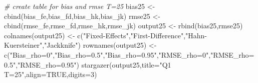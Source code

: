 \documentclass[
]{article}
\newenvironment{Shaded}{\begin{snugshade}}{\end{snugshade}}
\newcommand{\AttributeTok}[1]{\textcolor[rgb]{0.77,0.63,0.00}{#1}}
\newcommand{\CommentTok}[1]{\textcolor[rgb]{0.56,0.35,0.01}{\textit{#1}}}
\newcommand{\ConstantTok}[1]{\textcolor[rgb]{0.00,0.00,0.00}{#1}}
\newcommand{\DecValTok}[1]{\textcolor[rgb]{0.00,0.00,0.81}{#1}}
\newcommand{\FunctionTok}[1]{\textcolor[rgb]{0.00,0.00,0.00}{#1}}
\newcommand{\NormalTok}[1]{#1}
\newcommand{\OtherTok}[1]{\textcolor[rgb]{0.56,0.35,0.01}{#1}}
\newcommand{\StringTok}[1]{\textcolor[rgb]{0.31,0.60,0.02}{#1}}
\begin{document}
\begin{Shaded}
\begin{Highlighting}[]
\CommentTok{\# create table for bias and rmse T=25}
\NormalTok{bias25 }\OtherTok{\textless{}{-}} \FunctionTok{cbind}\NormalTok{(bias\_fe,bias\_fd,bias\_hk,bias\_jk)}
\NormalTok{rmse25 }\OtherTok{\textless{}{-}} \FunctionTok{cbind}\NormalTok{(rmse\_fe,rmse\_fd,rmse\_hk,rmse\_jk)}
\NormalTok{output25 }\OtherTok{\textless{}{-}} \FunctionTok{rbind}\NormalTok{(bias25,rmse25)}
\FunctionTok{colnames}\NormalTok{(output25) }\OtherTok{\textless{}{-}} \FunctionTok{c}\NormalTok{(}\StringTok{"Fixed{-}Effects"}\NormalTok{,}\StringTok{"First{-}Difference"}\NormalTok{,}\StringTok{"Hahn{-}Kuersteiner"}\NormalTok{,}\StringTok{"Jackknife"}\NormalTok{)}
\FunctionTok{rownames}\NormalTok{(output25) }\OtherTok{\textless{}{-}} \FunctionTok{c}\NormalTok{(}\StringTok{"Bias\_rho=0"}\NormalTok{,}\StringTok{"Bias\_rho=0.5"}\NormalTok{,}\StringTok{"Bias\_rho=0.95"}\NormalTok{,}\StringTok{"RMSE\_rho=0"}\NormalTok{,}\StringTok{"RMSE\_rho=0.5"}\NormalTok{,}\StringTok{"RMSE\_rho=0.95"}\NormalTok{)}
\FunctionTok{stargazer}\NormalTok{(output25,}\AttributeTok{title=}\StringTok{"Q1 T=25"}\NormalTok{,}\AttributeTok{align=}\ConstantTok{TRUE}\NormalTok{,}\AttributeTok{digits=}\DecValTok{3}\NormalTok{)}
\end{Highlighting}
\end{Shaded}
\end{document}
